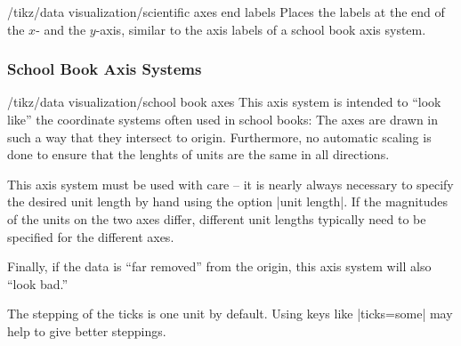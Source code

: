 \begin{key}{/tikz/data visualization/scientific axes end labels}
  Places the labels at the end of the $x$- and the $y$-axis, similar
  to the axis labels of a school book axis system.
\begin{codeexample}[]
\end{codeexample}
\end{key}





\subsubsection{School Book Axis Systems}

\begin{key}{/tikz/data visualization/school book axes}
  This axis system is intended to ``look like'' the coordinate systems
  often used in school books: The axes are drawn in such a way that
  they intersect to origin. Furthermore, no automatic
  scaling is done to ensure that the lenghts of units are the same in
  all directions.

  This axis system must be used with care -- it is nearly always
  necessary to specify the desired unit length by hand using the
  option |unit length|. If the magnitudes of the units on the two axes
  differ, different unit lengths typically need to be specified for
  the different axes.

  Finally, if the data is ``far removed'' from the origin, this
  axis system will also ``look bad.''

\begin{codeexample}[]
\end{codeexample}

  The stepping of the ticks is one unit by default. Using keys like
  |ticks=some| may help to give better steppings.
\end{key}


